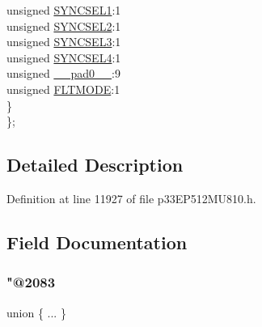 \begin{DoxyCompactItemize}
\begin{tabbing}
\>\>unsigned \hyperlink{structtag_o_c12_c_o_n2_b_i_t_s_a50e73f95ab1c258ddc64f69c0991deaf}{SYNCSEL1}:1\\
\>\>unsigned \hyperlink{structtag_o_c12_c_o_n2_b_i_t_s_a304907a5d2c4cbf1114a54642a85951e}{SYNCSEL2}:1\\
\>\>unsigned \hyperlink{structtag_o_c12_c_o_n2_b_i_t_s_a6bbd1bd2ead6c9fa713969c6eb0f0c75}{SYNCSEL3}:1\\
\>\>unsigned \hyperlink{structtag_o_c12_c_o_n2_b_i_t_s_a0cd5bbe196c7974953909d27a6307bb7}{SYNCSEL4}:1\\
\>\>unsigned \hyperlink{structtag_o_c12_c_o_n2_b_i_t_s_adf71f3d8410c1f1dbbc96680a92c49af}{\_\_pad0\_\_}:9\\
\>\>unsigned \hyperlink{structtag_o_c12_c_o_n2_b_i_t_s_ad53c2a5303780172219bfd5e0100c782}{FLTMODE}:1\\
\>\} \\
\}; \\

\end{tabbing}\end{DoxyCompactItemize}


\subsection{Detailed Description}


Definition at line 11927 of file p33\+E\+P512\+M\+U810.\+h.



\subsection{Field Documentation}
\mbox{\label{structtag_o_c12_c_o_n2_b_i_t_s_abecf8168a48e4c86e9b4754e84569d3c}} 
\subsubsection{\texorpdfstring{"@2083}{@2083}}
{\footnotesize\ttfamily union \{ ... \} }

\mbox{\label{structtag_o_c12_c_o_n2_b_i_t_s_adf71f3d8410c1f1dbbc96680a92c49af}} 
